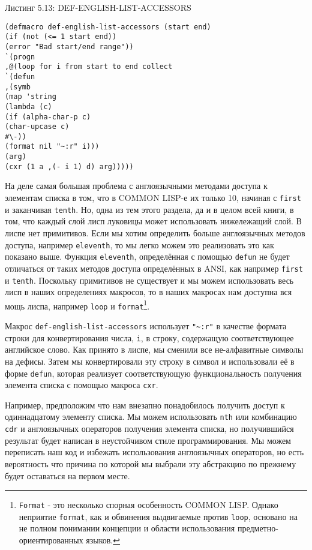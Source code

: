 Листинг 5.13: DEF-ENGLISH-LIST-ACCESSORS\label{listing_5.13}
\listbegin
\begin{verbatim}
(defmacro def-english-list-accessors (start end)
(if (not (<= 1 start end))
(error "Bad start/end range"))
`(progn
,@(loop for i from start to end collect
`(defun
,(symb
(map 'string
(lambda (c)
(if (alpha-char-p c)
(char-upcase c)
#\-))
(format nil "~:r" i)))
(arg)
(cxr (1 a ,(- i 1) d) arg)))))
\end{verbatim}
\listend

На деле самая большая проблема с англоязычными методами доступа к элементам списка в том, что в COMMON LISP-е их только 10, начиная с \verb"first" и заканчивая \verb"tenth". Но, одна из тем этого раздела, да и в целом всей книги, в том, что каждый слой лисп луковицы может использовать нижележащий слой. В лиспе нет примитивов. Если мы хотим определить больше англоязычных методов доступа, например \verb"eleventh", то мы легко можем это реализовать это как показано выше. Функция \verb"eleventh", определённая с помощью \verb"defun" не будет отличаться от таких методов доступа определённых в ANSI, как например \verb"first" и \verb"tenth". Поскольку примитивов не существует и мы можем использовать весь лисп в наших определениях макросов, то в наших макросах нам доступна вся мощь лиспа, например \verb"loop" и \verb"format"\footnote{\verb"Format" - это несколько спорная особенность COMMON LISP. Однако неприятие \verb"format", как и обвинения выдвигаемые против \verb"loop", основано на не полном понимании концепции и области использования предметно-ориентированных языков.}.



Макрос \verb"def-english-list-accessors" использует \verb|"~:r"| в качестве формата строки для конвертирования числа, \verb|i|, в строку, содержащую соответствующее английское слово. Как принято в лиспе, мы сменили все не-алфавитные символы на дефисы. Затем мы конвертировали эту строку в символ и использовали её в форме \verb|defun|, которая реализует соответствующую функциональность получения элемента списка с помощью макроса \verb|cxr|.

Например, предположим что нам внезапно понадобилось получить доступ к одиннадцатому элементу списка. Мы можем использовать \verb|nth| или комбинацию \verb|cdr| и англоязычных операторов получения элемента списка, но получившийся результат будет написан в неустойчивом стиле программирования. Мы можем переписать наш код и избежать использования англоязычных операторов, но есть вероятность что причина по которой мы выбрали эту абстракцию по прежнему будет оставаться на первом месте.

